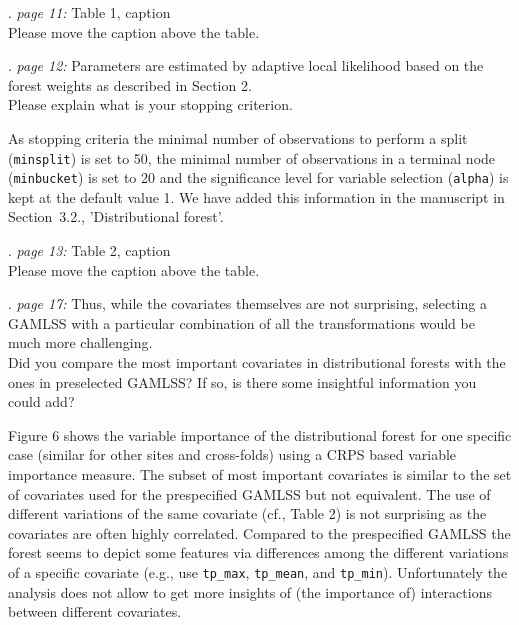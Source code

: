 \documentclass[american,foldmarks=false,noconfig]{uibklttr}
\let\code=\texttt
\newenvironment{review}{\fontshape{\itdefault}\fontseries{\bfdefault} \selectfont \smallskip}{\par}
\begin{document}
\begin{review}
12. {\color{quotecolor}\textit{page 11:} Table 1, caption}\\
Please move the caption above the table.
\end{review}


\begin{review}
13. {\color{quotecolor}\textit{page 12:} Parameters are estimated 
by adaptive local likelihood based on the forest weights as 
described in Section 2.}\\
Please explain what is your stopping criterion.
\end{review}

As stopping criteria the minimal number of observations to perform 
a split (\texttt{minsplit}) is set to 50,  the minimal number of 
observations in a terminal node (\texttt{minbucket}) is set to 20 
and the significance level for variable selection (\texttt{alpha}) 
is kept at the default value 1. We have added this information in 
the manuscript in Section~3.2., 'Distributional forest'.


\begin{review}
14. {\color{quotecolor}\textit{page 13:} Table 2, caption}\\
Please move the caption above the table.
\end{review}


\begin{review}
15. {\color{quotecolor}\textit{page 17:} Thus, while the covariates 
themselves are not surprising, selecting a GAMLSS with a particular 
combination of all the transformations would be much more challenging.}\\
Did you compare the most important covariates in distributional forests
with the ones in preselected GAMLSS? If so, is there some insightful
information you could add?
\end{review}

Figure 6 shows the variable importance of the distributional forest
for one specific case (similar for other sites and cross-folds) 
using a CRPS based variable importance measure. The subset of 
most important covariates is similar to the set of covariates 
used for the prespecified GAMLSS but not equivalent.
The use of different variations of the same covariate (cf., Table 2)
is not surprising as the covariates are often highly correlated.
Compared to the prespecified GAMLSS the forest seems to depict some
features via differences among the different variations of a specific
covariate (e.g., use \code{tp\_max}, \code{tp\_mean}, and \code{tp\_min}).
Unfortunately the analysis does not allow to get more insights
of (the importance of) interactions between different covariates.
\end{document}

